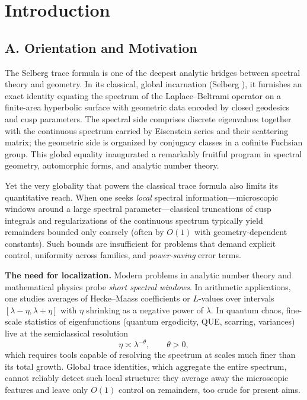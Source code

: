 
\section{Introduction}
\label{sec:introduction}

\subsection*{A. Orientation and Motivation}

The Selberg trace formula is one of the deepest analytic bridges between spectral
theory and geometry. In its classical, global incarnation (Selberg \cite{Selberg1956}),
it furnishes an exact identity equating the spectrum of the Laplace–Beltrami operator
on a finite-area hyperbolic surface with geometric data encoded by closed geodesics
and cusp parameters. The spectral side comprises discrete eigenvalues together with
the continuous spectrum carried by Eisenstein series and their scattering matrix;
the geometric side is organized by conjugacy classes in a cofinite Fuchsian group.
This global equality inaugurated a remarkably fruitful program in spectral geometry,
automorphic forms, and analytic number theory.

Yet the very globality that powers the classical trace formula also limits its
quantitative reach. When one seeks \emph{local} spectral information—microscopic
windows around a large spectral parameter—classical truncations of cusp integrals
and regularizations of the continuous spectrum typically yield remainders bounded
only coarsely (often by $O(1)$ with geometry-dependent constants). Such bounds are
insufficient for problems that demand explicit control, uniformity across families,
and \emph{power-saving} error terms.

\medskip

\noindent\textbf{The need for localization.}
Modern problems in analytic number theory and mathematical physics probe
\emph{short spectral windows}. In arithmetic applications, one studies averages
of Hecke–Maass coefficients or $L$-values over intervals
$[\lambda-\eta,\lambda+\eta]$ with $\eta$ shrinking as a negative power of $\lambda$.
In quantum chaos, fine-scale statistics of eigenfunctions (quantum ergodicity,
QUE, scarring, variances) live at the semiclassical resolution
\[
  \eta \asymp \lambda^{-\theta}, \qquad \theta>0,
\]
which requires tools capable of resolving the spectrum at scales much finer than
its total growth. Global trace identities, which aggregate the entire spectrum,
cannot reliably detect such local structure: they average away the microscopic
features and leave only $O(1)$ control on remainders, too crude for present aims.

